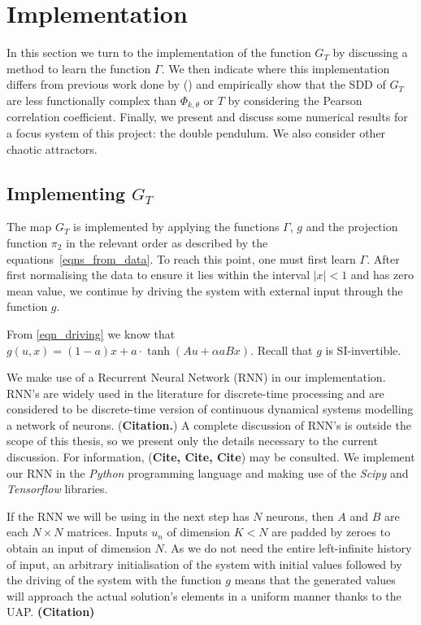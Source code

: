\documentclass[a4paper,12pt,twoside]{report}
\begin{document}

\chapter{Implementation} \label{ch5}
 
In this section we turn to the implementation of the function $G_T$ by discussing a method to learn the function $\Gamma$. We then indicate where this implementation differs from previous work done by (\cite{manjunath2021universal}) and empirically show that the SDD of $G_T$ are less functionally complex than $\Phi_{k, \theta}$ or $T$ by considering the Pearson correlation coefficient. 
Finally, we present and discuss some numerical results for a focus system of this project: the double pendulum. We also consider other chaotic attractors.

\section{Implementing $G_T$}
The map $G_T$ is implemented by applying the functions $\Gamma$, $g$ and the projection function $\pi_2$ in the relevant order as described by the equations~\ref{eqns_from_data}. To reach this point, one must first learn $\Gamma$.
After first normalising the data to ensure it lies within the interval $|x| < 1$ and has zero mean value, we continue by driving the system with external input through the function $g$.

From \eqref{eqn_driving} we know that $ g(u,x)=(1-a)x+a{\cdot}\tanh(Au+\alpha{a}Bx)$. Recall that $g$ is SI-invertible. %

We make use of a Recurrent Neural Network (RNN) in our implementation. RNN's are widely used in the literature for discrete-time processing and are considered to be discrete-time version of continuous dynamical systems modelling a network of neurons. (\textbf{Citation.})
A complete discussion of RNN's is outside the scope of this thesis, so we present only the details necessary to the current discussion. For information, (\textbf{Cite, Cite, Cite}) may be consulted. We implement our RNN in the \emph{Python} programming language and making use of the \emph{Scipy} and \emph{Tensorflow} libraries.

If the RNN we will be using in the next step has $N$ neurons, then $A$ and $B$ are each $N\times{N}$ matrices. Inputs $u_n$ of dimension $K < N$ are padded by zeroes to obtain an input of dimension $N$. As we do not need the entire left-infinite history of input, an arbitrary initialisation of the system with initial values followed by the driving of the system with the function $g$ means that the generated values will approach the actual solution’s elements in a uniform manner thanks to the UAP. \textbf{(Citation)}
\end{document}
